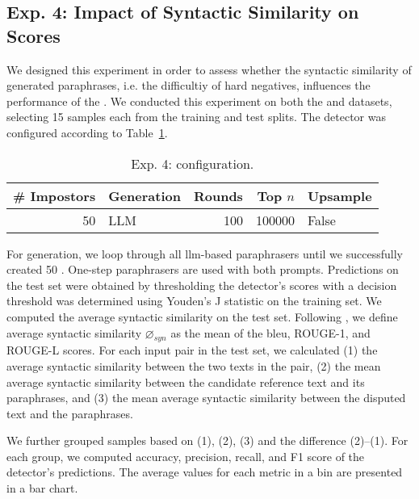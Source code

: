 \subsection{Exp. 4: Impact of Syntactic Similarity on \impAppr{} Scores}
\label{sec:syn_sim_impact_}

We designed this experiment in order to assess whether the syntactic similarity of generated paraphrases, i.e. the difficultiy of hard negatives, influences the performance of the \impAppr{}.
We conducted this experiment on both the \dataBlog{} and \dataStudent{} datasets, selecting 15 samples each from the training and test splits. 
The detector was configured according to Table~\ref{tab:imp_syn_sim_config}.

\begin{table}[h]
\centering\small
\caption{Exp. 4: \impAppr{} configuration.}
\label{tab:imp_syn_sim_config}
\begin{tabular}{@{}rlrrl@{}}   %
\toprule
\# Impostors & Generation & Rounds & Top $n$ & Upsample \\
\midrule
50 & LLM & 100 & \num{100000} & False \\
\bottomrule
\end{tabular}%
\end{table}

For generation, we loop through all \ac{llm}-based paraphrasers until we successfully created 50 \imps{}.
One-step paraphrasers are used with both prompts.
Predictions on the test set were obtained by thresholding the detector’s scores with a decision threshold was determined using Youden’s J statistic on the training set.
We computed the average syntactic similarity on the test set. 
Following \citet{gohsen_captions_2023}, we define average syntactic similarity $\diameter_{syn}$ as the mean of the \ac{bleu}, ROUGE-1, and ROUGE-L scores. 
For each input pair in the test set, we calculated
(1) the average syntactic similarity between the two texts in the pair, (2) the mean average syntactic similarity between the candidate reference text and its paraphrases, and (3) the mean average syntactic similarity between the disputed text and the paraphrases.

We further grouped samples based on (1), (2), (3) and the difference (2)–(1). 
For each group, we computed accuracy, precision, recall, and F1 score of the detector’s predictions. 
The average values for each metric in a bin are presented in a bar chart.

